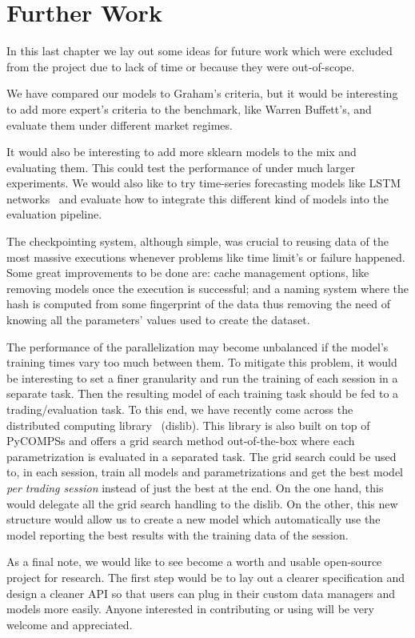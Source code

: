 \chapter{Further Work}

\label{chap:further} 

In this last chapter we lay out some ideas for future work which were excluded from the project due to lack of time or because they were out-of-scope.

We have compared our models to Graham's criteria, but it would be interesting to add more expert's criteria to the benchmark, like Warren Buffett's, and evaluate them under different market regimes.

It would also be interesting to add more sklearn models to the mix and evaluating them. This could test the performance of \HPCsys under much larger experiments. We would also like to try time-series forecasting models like LSTM networks~\cite{lstm} and evaluate how to integrate this different kind of models into the evaluation pipeline.

The checkpointing system, although simple, was crucial to reusing data of the most massive executions whenever problems like time limit's or failure happened. Some great improvements to be done are: cache management options, like removing models once the execution is successful; and a naming system where the hash is computed from some fingerprint of the data thus removing the need of knowing all the parameters' values used to create the dataset.

The performance of the parallelization may become unbalanced if the model's training times vary too much between them. To mitigate this problem, it would be interesting to set a finer granularity and run the training of each session in a separate task. Then the resulting model of each training task should be fed to a trading/evaluation task. To this end, we have recently come across the distributed computing library~\cite{dislib} (dislib). This library is also built on top of PyCOMPSs and offers a grid search method out-of-the-box where each parametrization is evaluated in a separated task. The grid search could be used to, in each session, train all models and parametrizations and get the best model \textit{per trading session} instead of just the best at the end. On the one hand, this would delegate all the grid search handling to the dislib. On the other, this new structure would allow us to create a new model which automatically use the model reporting the best results with the training data of the session.

As a final note, we would like to see \HPCsys become a worth and usable open-source project for research. The first step would be to lay out a clearer specification and design a cleaner API so that users can plug in their custom data managers and models more easily. 
Anyone interested in contributing or using \HPCsys will be very welcome and appreciated.